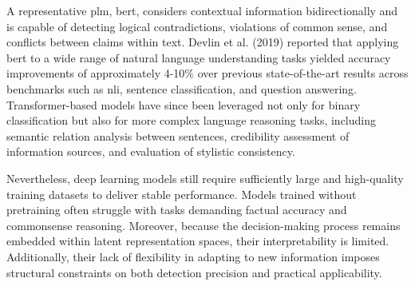 \documentclass[a4paper,fleqn]{cas-sc}
\begin{document}
A representative \gls{plm}, \gls{bert}, considers contextual information bidirectionally and is capable of detecting logical contradictions, violations of common sense, and conflicts between claims within text. Devlin et al. (2019) reported that applying \gls{bert} to a wide range of natural language understanding tasks yielded accuracy improvements of approximately 4-10\% over previous state-of-the-art results across benchmarks such as \gls{nli}, sentence classification, and question answering. Transformer-based models have since been leveraged not only for binary classification but also for more complex language reasoning tasks, including semantic relation analysis between sentences, credibility assessment of information sources, and evaluation of stylistic consistency.

Nevertheless, deep learning models still require sufficiently large and high-quality training datasets to deliver stable performance. Models trained without pretraining often struggle with tasks demanding factual accuracy and commonsense reasoning. Moreover, because the decision-making process remains embedded within latent representation spaces, their interpretability is limited. Additionally, their lack of flexibility in adapting to new information imposes structural constraints on both detection precision and practical applicability.
\end{document}
